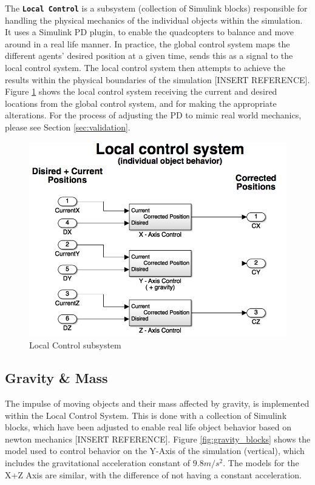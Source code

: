 The \textbf{\texttt{Local Control}} is a subsystem (collection of Simulink blocks) responsible for handling the physical mechanics of the individual objects within the simulation. It uses a Simulink PD plugin, to enable the quadcopters to balance and move around in a real life manner. In practice, the global control system maps the different agents' desired position at a given time, sends this as a signal to the local control system. The local control system then attempts to achieve the results within the physical boundaries of the simulation [INSERT REFERENCE]. Figure \ref{fig:local_control} shows the local control system receiving the current and desired locations from the global control system, and for making the appropriate alterations. For the process of adjusting the PD to mimic real world mechanics, please see Section \ref{sec:validation}.

\begin{figure}
	\centering
	\includegraphics[width=.7\columnwidth]{figures/local_control}
  	\caption{\label{fig:local_control}Local Control subsystem}
\end{figure}

\subsection{Gravity \& Mass}
\label{sec:sim_gravity}

The impulse of moving objects and their mass affected by gravity, is implemented within the Local Control System. This is done with a collection of Simulink blocks, which have been adjusted to enable real life object behavior based on newton mechanics [INSERT REFERENCE]. Figure \ref{fig:gravity_blocks} shows the model used to control behavior on the Y-Axis of the simulation (vertical), which includes the gravitational acceleration constant of ${9.8m/s^2}$. The models for the X+Z Axis are similar, with the difference of not having a constant acceleration.

